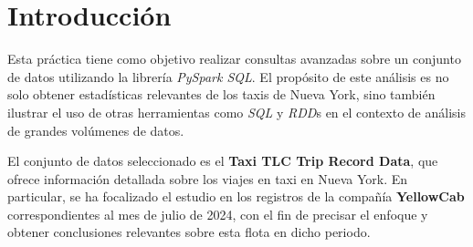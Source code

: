 \section{Introducción}
Esta práctica tiene como objetivo realizar consultas avanzadas sobre un conjunto de datos utilizando la librería \textit{PySpark SQL}. El propósito de este análisis es no solo obtener estadísticas relevantes de los taxis de Nueva York, sino también ilustrar el uso de otras herramientas como \textit{SQL} y \textit{RDD}s en el contexto de análisis de grandes volúmenes de datos.

El conjunto de datos seleccionado es el \textbf{Taxi TLC Trip Record Data}, que ofrece información detallada sobre los viajes en taxi en Nueva York. En particular, se ha focalizado el estudio en los registros de la compañía \textbf{YellowCab} correspondientes al mes de julio de 2024, con el fin de precisar el enfoque y obtener conclusiones relevantes sobre esta flota en dicho periodo.
